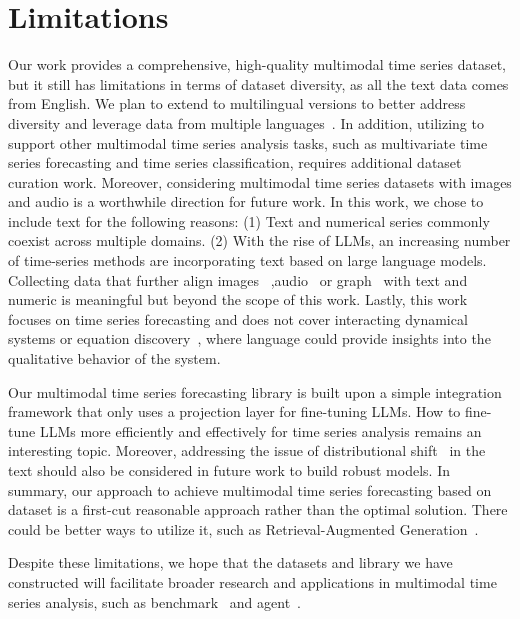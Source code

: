 \section{Limitations}\label{app:limitaion}
Our work provides a comprehensive, high-quality multimodal time series dataset, but it still has limitations in terms of dataset diversity, as all the text data comes from English. We plan to extend \model to multilingual versions to better address diversity and leverage data from multiple languages~\cite{jin2024better}.  In addition, utilizing \model to support other multimodal time series analysis tasks, such as multivariate time series forecasting and time series classification, requires additional dataset curation work.  Moreover, considering multimodal time series datasets with images and audio is a worthwhile direction for future work. In this work, we chose to include text for the following reasons: (1) Text and numerical series commonly coexist across multiple domains. (2) With the rise of LLMs, an increasing number of time-series methods are incorporating text based on large language models. Collecting data that further align images~\cite{gerard2023wildfirespreadts} ,audio~\cite{kashino1999time} or graph~\cite{liu2021signed} with text and numeric is meaningful but beyond the scope of this work. Lastly, this work focuses on time series forecasting and does not cover interacting dynamical systems or equation discovery~\cite{liuamortized}, where language could provide insights into the qualitative behavior of the system.

Our multimodal time series forecasting library is built upon a simple integration framework that only uses a projection layer for fine-tuning LLMs. How to fine-tune LLMs more efficiently and effectively for time series analysis remains an interesting topic. Moreover, addressing the issue of distributional shift~\cite{zhang2022towards,zhao2023performative,liu2024time} in the text should also be considered in future work to build robust models. In summary, our approach to achieve multimodal time series forecasting based on \model dataset is a first-cut reasonable approach rather than the optimal solution. There could be better ways to utilize it, such as Retrieval-Augmented Generation~\cite{gao2023retrieval}.









Despite these limitations, we hope that the datasets and library we have constructed will facilitate broader research and applications in multimodal time series analysis, such as benchmark~\cite{jin2024mm} and agent~\cite{jin2024agentreview}.
